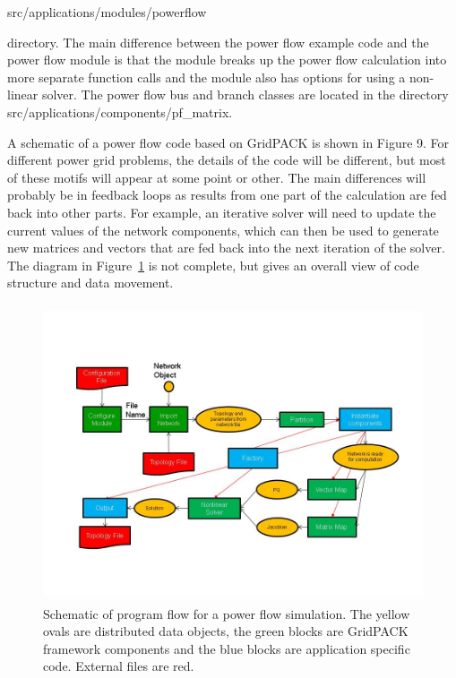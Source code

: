 \documentclass[12pt]{report} %
\begin{document}
src/applications/modules/powerflow 

directory. The main difference between the power flow example code and the power flow module is that the module breaks up the power flow calculation into more separate function calls and the module also has options for using a non-linear solver. The power flow bus and branch classes are located in the directory src/applications/components/pf\_matrix.

A schematic of a power flow code based on GridPACK is shown in Figure 9. For different power grid problems, the details of the code will be different, but most of these motifs will appear at some point or other. The main differences will probably be in feedback loops as results from one part of the calculation are fed back into other parts. For example, an iterative solver will need to update the current values of the network components, which can then be used to generate new matrices and vectors that are fed back into the next iteration of the solver. The diagram in Figure~\ref{fig:fig-9} is not complete, but gives an overall view of code structure and data movement.

\begin{figure}
  \centering
    \includegraphics*[width=6.50in, height=3.45in, keepaspectratio=false, trim=0.00in 0.68in 0.00in 0.75in]{Fig9}
  \caption{Schematic of program flow for a power flow simulation. The yellow ovals are distributed data objects, the green blocks are GridPACK framework components and the blue blocks are application specific code. External files are red.}
  \label{fig:fig-9}
\end{figure}

\end{document}
